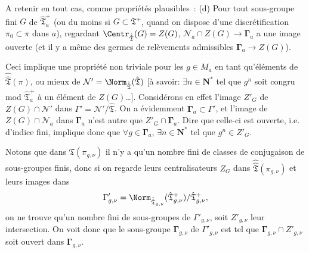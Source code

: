 A retenir en tout cas, comme propriétés plausibles~: (d) Pour tout sous-groupe fini $G$ de $\hat{\mathfrak{T}}^+_a$ (ou du moins si $G\subset \mathfrak{T}^+$, quand on dispose d'une discrétification $\pi_0\subset \pi$ dans $a$), regardant ${\Centr}_{\hat{\hat{\mathfrak{T}}}}(G)=Z(G)$, $\mathcal{N}_a\cap Z(G)\to \boldsymbol{\Gamma}_a$ a une image ouverte (et il y a même des germes de relèvements admissibles $\boldsymbol{\Gamma}_a\to Z(G)$).

Ceci implique une propriété non triviale pour les $g\in M_a$ en tant qu'éléments de $\hat{\hat{\mathfrak{T}}}(\pi)$, ou mieux de $\mathcal{N}'={\Norm}_{\hat{\hat{\mathfrak{T}}}}(\hat{\mathfrak{T}})$ [à savoir: $\exists n\in\mathbf{N}^*$ tel que $g^n$ soit congru mod $\hat{\mathfrak{T}}^+_a$ à un élément de $Z(G)$\dots]. Considérons en effet l'image $Z'_G$ de $Z(G)\cap\mathcal{N}'$ dans $\Gamma'=\mathcal{N}'/\hat{\mathfrak{T}}$. On a évidemment $\boldsymbol{\Gamma}_a\subset \Gamma'$, et l'image de $Z(G)\cap\mathcal{N}_a$ dans $\boldsymbol{\Gamma}_a$ n'est autre que $Z'_G\cap\boldsymbol{\Gamma}_a$. Dire que celle-ci est ouverte, i.e. d'indice fini, implique donc que $\forall g\in\boldsymbol{\Gamma}_a$, $\exists n\in\mathbf{N}^*$ tel que $g^n\in Z'_G$.

Notons que dans $\mathfrak{T}(\pi_{g,\nu})$ il n'y a qu'un nombre fini de classes de conjugaison de sous-groupes finis, donc si on regarde leurs centralisateurs $Z_G$ dans ${\hat{\hat{\mathfrak{T}}}}(\pi_{g,\nu})$ et leurs images dans
$$
\Gamma'_{g,\nu}={\Norm}_{\hat{\hat{\mathfrak{T}}}_{g,\nu}}(\hat{\mathfrak{T}}^+_{g,\nu})/\hat{\mathfrak{T}}^+_{g,\nu},
$$
on ne trouve qu'un nombre fini de sous-groupes de $\Gamma'_{g,\nu}$, soit $Z'_{g,\nu}$ leur intersection. On voit donc que le sous-groupe $\boldsymbol{\Gamma}_{g,\nu}$ de $\Gamma'_{g,\nu}$ est tel que $\boldsymbol{\Gamma}_{g,\nu}\cap Z'_{g,\nu}$ soit ouvert dans $\boldsymbol{\Gamma}_{g,\nu}$.

